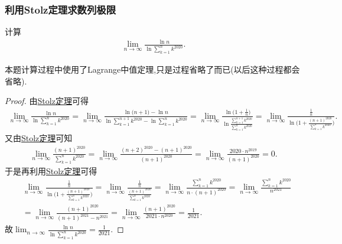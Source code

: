 \documentclass[lang=cn,newtx,10pt,scheme=chinese]{elegantbook}
\begin{document}
\subsubsection{利用Stolz定理求数列极限}

\begin{example}
计算
\begin{align*}
\lim_{n \to \infty} \frac{\ln n}{\ln \sum\limits_{k = 1}^{n} k^{2020}}.
\end{align*}
\end{example}
\begin{note}
本题计算过程中使用了Lagrange中值定理,只是过程省略了而已(以后这种过程都会省略).
\end{note}
\begin{proof}
由\hyperref[theorem:Stolz定理]{Stolz定理}可得
\begin{align*}
\lim_{n \to \infty} \frac{\ln n}{\ln \sum\limits_{k = 1}^{n} k^{2020}}=\lim_{n\rightarrow \infty} \frac{\ln\mathrm{(}n+1)-\ln n}{\ln \sum\limits_{k=1}^{n+1}{k^{2020}}-\ln \sum\limits_{k=1}^n{k^{2020}}}=\lim_{n\rightarrow \infty} \frac{\ln\mathrm{(}1+\frac{1}{n})}{\ln \frac{\sum\limits_{k=1}^{n+1}{k^{2020}}}{\sum\limits_{k=1}^n{k^{2020}}}}=\lim_{n\rightarrow \infty} \frac{\frac{1}{n}}{\ln\mathrm{(}1+\frac{(n+1)^{2020}}{\sum\limits_{k=1}^n{k^{2020}}})}.
\end{align*}
又由\hyperref[theorem:Stolz定理]{Stolz定理}可知
\begin{align*}
\lim_{n\rightarrow \infty} \frac{(n+1)^{2020}}{\sum\limits_{k=1}^n{k^{2020}}}=\lim_{n\rightarrow \infty} \frac{(n+2)^{2020}-(n+1)^{2020}}{(n+1)^{2020}}=\lim_{n\rightarrow \infty} \frac{2020\cdot n^{2019}}{(n+1)^{2020}}=0.
\end{align*}
于是再利用\hyperref[theorem:Stolz定理]{Stolz定理}可得
\begin{align*}
&\lim_{n\rightarrow \infty} \frac{\frac{1}{n}}{\ln\mathrm{(}1+\frac{(n+1)^{2020}}{\sum\limits_{k=1}^n{k^{2020}}})}=\lim_{n\rightarrow \infty} \frac{\frac{1}{n}}{\frac{(n+1)^{2020}}{\sum\limits_{k=1}^n{k^{2020}}}}=\lim_{n\rightarrow \infty} \frac{\sum\limits_{k=1}^n{k^{2020}}}{n\cdot (n+1)^{2020}}=\lim_{n\rightarrow \infty} \frac{\sum\limits_{k=1}^n{k^{2020}}}{n^{2021}}  \\
&=\lim_{n\rightarrow \infty} \frac{(n+1)^{2020}}{(n+1)^{2021}-n^{2021}}=\lim_{n\rightarrow \infty} \frac{(n+1)^{2020}}{2021\cdot n^{2020}}=\frac{1}{2021}.
\end{align*}
故$\lim_{n \to \infty} \frac{\ln n}{\ln \sum\limits_{k = 1}^{n} k^{2020}}=\frac{1}{2021}$.
\end{proof}
\end{document}
